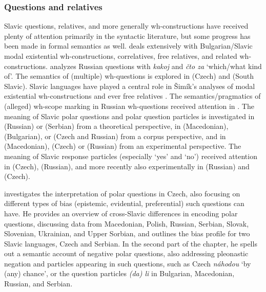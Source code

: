 \documentclass[output=paper,colorlinks,citecolor=brown]{langscibook}
\begin{document}
\subsubsection{Questions and relatives} Slavic questions, relatives, and more generally wh-constructions have received plenty of attention primarily in the syntactic literature, but some progress has been made in formal semantics as well. \citet{izvorski96,izvorski98,panchevaizvorski00} deals extensively with Bulgarian/Slavic modal existential wh-constructions, correlatives, free relatives, and related wh-constructions. \citet{zimmermann2008} analyzes Russian questions with \textit{kakoj} and \textit{čto za} `which/what kind of'. The semantics of (multiple) wh-questions is explored in \citet{simik10} (Czech) and \citet{Simeonova2025} (South Slavic). Slavic languages have played a central role in Šimík's analyses of modal existential wh-constructions \citep{simik11,simik13} and ever free relatives \citep{simik18}. The semantics/pragmatics of (alleged) wh-scope marking in Russian wh-questions received attention in \citet{korotkova12}. The meaning of Slavic polar questions and polar question particles is investigated in \citet{Korotkova2023} (Russian) or \citet{Oikonomou.Ilic2023,Todorovic2024} (Serbian) from a theoretical perspective, in \citet{Mitkovska.etal2024} (Macedonian), \citet{Simeonova.Kamali2024} (Bulgarian), or \citet{Onoeva.Stankova2025} (Czech and Russian) from a corpus perspective, and in \citet{Jordanoska.Meertens2021} (Macedonian), \citet{Stankova.Simik2025} (Czech) or \citet{Repp.Geist2025} (Russian) from an experimental perspective. The meaning of Slavic response particles (especially `yes' and `no') received attention in \citet{GruetSkrabalova2015} (Czech), \citet{Esipova2021} (Russian), and more recently also experimentally in \citet{Geist.Repp2023} (Russian) and \citet{Hrdinkova.Simik2025} (Czech).

 investigates the interpretation of polar questions in Czech, also focusing on different types of bias (epistemic, evidential, preferential) such questions can have. He provides an overview of cross-Slavic differences in encoding polar questions, discussing data from Macedonian, Polish, Russian, Serbian, Slovak, Slovenian, Ukrainian, and Upper Sorbian, and outlines the bias profile for two Slavic languages, Czech and Serbian. In the second part of the chapter, he spells out a semantic account of negative polar questions, also addressing pleonastic negation and particles appearing in such questions, such as Czech \textit{náhodou} `by (any) chance', or the question particles \textit{(da) li} in Bulgarian, Macedonian, Russian, and Serbian.  
\end{document}
